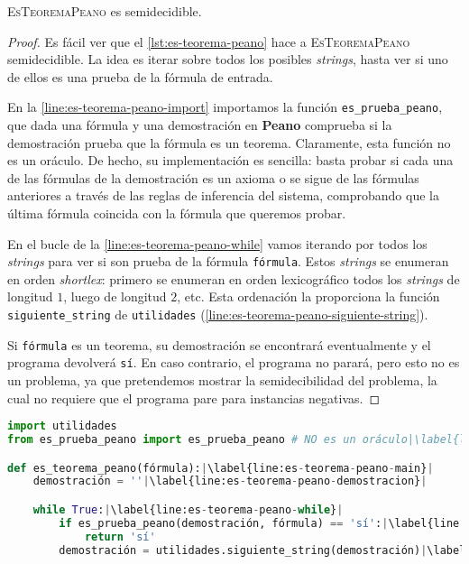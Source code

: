 \begin{proposicion}\label{prop:es-teorema-peano-semidecidible}
\textsc{EsTeoremaPeano} es semidecidible.
\end{proposicion}
\begin{proof}
Es fácil ver que el \cref{lst:es-teorema-peano} hace a \textsc{EsTeoremaPeano} semidecidible. La idea es iterar sobre todos los posibles \emph{strings}, hasta ver si uno de ellos es una prueba de la fórmula de entrada.

En la \cref{line:es-teorema-peano-import} importamos la función \texttt{es\_prueba\_peano}, que dada una fórmula y una demostración en \textbf{Peano} comprueba si la demostración prueba que la fórmula es un teorema. Claramente, esta función no es un oráculo. De hecho, su implementación es sencilla: basta probar si cada una de las fórmulas de la demostración es un axioma o se sigue de las fórmulas anteriores a través de las reglas de inferencia del sistema, comprobando que la última fórmula coincida con la fórmula que queremos probar.

En el bucle de la \cref{line:es-teorema-peano-while} vamos iterando por todos los \emph{strings} para ver si son prueba de la fórmula \texttt{fórmula}. Estos \emph{strings} se enumeran en orden \emph{shortlex}: primero se enumeran en orden lexicográfico todos los \emph{strings} de longitud $1$, luego de longitud $2$, etc. Esta ordenación la proporciona la función \texttt{siguiente\_string} de \texttt{utilidades} (\cref{line:es-teorema-peano-siguiente-string}).

Si \texttt{fórmula} es un teorema, su demostración se encontrará eventualmente y el programa devolverá \texttt{sí}. En caso contrario, el programa no parará, pero esto no es un problema, ya que pretendemos mostrar la semidecibilidad del problema, la cual no requiere que el programa pare para instancias negativas.
\end{proof}

\begin{lstlisting}[language=Python, caption=\lstinline{es_teorema_peano.py},label={lst:es-teorema-peano}]
import utilidades
from es_prueba_peano import es_prueba_peano # NO es un oráculo|\label{line:es-teorema-peano-import}|

def es_teorema_peano(fórmula):|\label{line:es-teorema-peano-main}|
    demostración = ''|\label{line:es-teorema-peano-demostracion}|

    while True:|\label{line:es-teorema-peano-while}|
        if es_prueba_peano(demostración, fórmula) == 'sí':|\label{line:es-teorema-peano-es-prueba}|
            return 'sí'
        demostración = utilidades.siguiente_string(demostración)|\label{line:es-teorema-peano-siguiente-string}|
\end{lstlisting}

